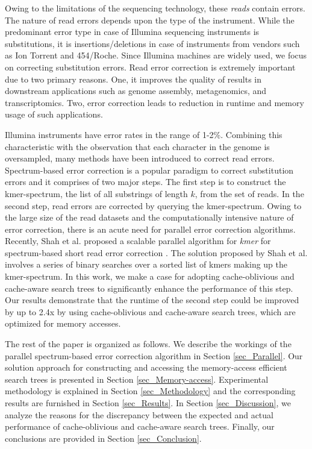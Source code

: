\documentclass[10pt, conference]{IEEEtran}
\begin{document}
Owing to the limitations of the sequencing technology, these {\it reads} contain errors. The nature of read errors depends upon the type of the instrument. While the predominant error type in case of Illumina sequencing instruments is substitutions, it is insertions/deletions in case of instruments from vendors such as Ion Torrent and 454/Roche. Since Illumina machines are widely used, we focus on correcting substitution errors. Read error correction is extremely important due to two primary reasons. One, it improves the quality of results in downstream applications such as genome assembly, metagenomics, and transcriptomics. Two, error correction leads to reduction in runtime and memory usage of such applications. 

Illumina instruments have error rates in the range of 1-2\%. Combining this characteristic with the observation that each character in the genome is oversampled, many methods have been introduced to correct read errors. Spectrum-based error correction is a popular paradigm to correct substitution errors and it comprises of two major steps. The first step is to construct the kmer-spectrum, the list of all substrings of length $k$, from the set of reads. In the second step, read errors are corrected by querying the kmer-spectrum. Owing to the large size of the read datasets and the computationally intensive nature of error correction, there is an acute need for parallel error correction algorithms. Recently, Shah et al. proposed a scalable parallel algorithm for {\it kmer} for spectrum-based short read error correction \cite{shah2012parallel}. The solution proposed by Shah et al. involves a series of binary searches over a sorted list of kmers making up the kmer-spectrum. In this work, we make a case for adopting cache-oblivious and cache-aware search trees to significantly enhance the performance of this step. Our results demonstrate that the runtime of the second step could be improved by up to 2.4x by using cache-oblivious and cache-aware search trees, which are optimized for memory accesses.

The rest of the paper is organized as follows. We describe the workings of the parallel spectrum-based error correction algorithm in Section \cref{sec_Parallel}. Our solution approach for constructing and accessing the memory-access efficient search trees is presented in Section \cref{sec_Memory-access}. Experimental methodology is explained in Section \cref{sec_Methodology} and the corresponding results are furnished in Section \cref{sec_Results}. In Section \cref{sec_Discussion}, we analyze the reasons for the discrepancy between the expected and actual performance of cache-oblivious and cache-aware search trees. Finally, our conclusions are provided in Section \cref{sec_Conclusion}.
\end{document}
